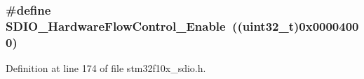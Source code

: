 \subsubsection[{\texorpdfstring{S\+D\+I\+O\+\_\+\+Hardware\+Flow\+Control\+\_\+\+Enable}{SDIO_HardwareFlowControl_Enable}}]{\setlength{\rightskip}{0pt plus 5cm}\#define S\+D\+I\+O\+\_\+\+Hardware\+Flow\+Control\+\_\+\+Enable~(({\bf uint32\+\_\+t})0x00004000)}\hypertarget{group___s_d_i_o___hardware___flow___control_gab6cfef6778d829f3dcefc6c2bad7c9aa}{}\label{group___s_d_i_o___hardware___flow___control_gab6cfef6778d829f3dcefc6c2bad7c9aa}


Definition at line 174 of file stm32f10x\+\_\+sdio.\+h.

